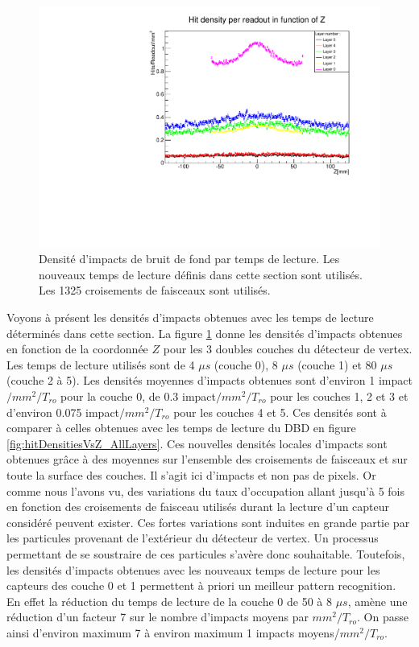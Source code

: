    \begin{figure}[!htb]
    \begin{center}
      \includegraphics[scale=0.70]{./figures/sensors_Readout_Time/hitDensities_vs_Z_Per_Readout_AllLayers_8_4_80.pdf}
      \caption{Densit\'e d'impacts de bruit de fond par temps de lecture. Les nouveaux temps de lecture d\'efinis dans cette section sont utilis\'es. Les 1325 croisements de faisceaux sont utilis\'es.}
      \label{fig:HitDensityNewReadout}
    \end{center}
  \end{figure}
   
  Voyons \`a pr\'esent les densit\'es d'impacts obtenues avec les temps de lecture d\'etermin\'es dans cette section. La figure \ref{fig:HitDensityNewReadout} donne les densit\'es d'impacts obtenues en fonction de la coordonn\'ee $Z$ pour les 3 doubles couches du d\'etecteur de vertex. Les temps de lecture utilis\'es sont de 4 $\mu s$ (couche 0), 8 $\mu s$ (couche 1) et 80 $\mu s$ (couche 2 \`a 5). Les densit\'es moyennes d'impacts obtenues sont d'environ 1 impact$/mm^2/T_{ro}$ pour la couche 0, de 0.3 impact$/mm^2/T_{ro}$ pour les couches 1, 2 et 3 et d'environ 0.075 impact$/mm^2/T_{ro}$ pour les couches 4 et 5. Ces densit\'es sont \`a comparer \`a celles obtenues avec les temps de lecture du DBD en figure \ref{fig:hitDensitiesVsZ_AllLayers}. Ces nouvelles densit\'es locales d'impacts sont obtenues gr\^ace \`a des moyennes sur l'ensemble des croisements de faisceaux et sur toute la surface des couches. Il s'agit ici d'impacts et non pas de pixels. Or comme nous l'avons vu, des variations du taux d'occupation allant jusqu'\`a 5 fois en fonction des croisements de faisceau utilis\'es durant la lecture d'un capteur consid\'er\'e peuvent exister. Ces fortes variations sont induites en grande partie par les particules provenant de l'ext\'erieur du d\'etecteur de vertex. Un processus permettant de se soustraire de ces particules s'av\`ere donc souhaitable. Toutefois, les densit\'es d'impacts obtenues avec les nouveaux temps de lecture pour les capteurs des couche 0 et 1 permettent \`a priori un meilleur pattern recognition. En effet la r\'eduction du temps de lecture de la couche 0 de 50 \`a 8 $\mu s$, am\`ene une r\'eduction d'un facteur 7 sur le nombre d'impacts moyens par $mm^2/T_{ro}$. On passe ainsi d'environ maximum 7 \`a environ maximum 1 impacts moyens/$mm^2/T_{ro}$.
  
